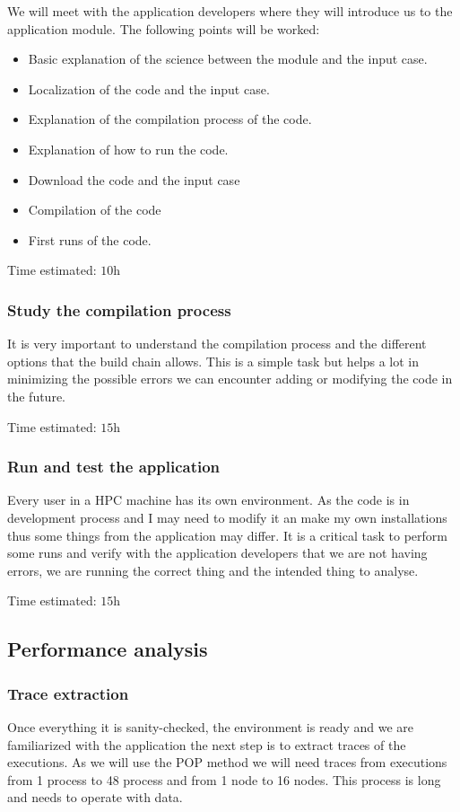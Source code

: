 We will meet with the application developers where they will introduce us to the application module. The following points will be worked:
\begin{itemize}
  \item Basic explanation of the science between the module and the input case.
  \item Localization of the code and the input case.
  \item Explanation of the compilation process of the code.
  \item Explanation of how to run the code.
  \item Download the code and the input case
  \item Compilation of the code
  \item First runs of the code.
\end{itemize}

Time estimated: $\si{10\hour}$
\subsubsection{Study the compilation process}

It is very important to understand the compilation process and the different options that the build chain allows. This is a simple task but helps a lot in minimizing the possible errors we can encounter adding or modifying the code in the future.

Time estimated: $\si{15\hour}$

\subsubsection{Run and test the application}
Every user in a HPC machine has its own environment. As the code is in development process and I may need to modify it an make my own installations thus some things from the application may differ. It is a critical task to perform some runs and verify with the application developers that we are not having errors, we are running the correct thing and the intended thing to analyse.  

Time estimated: $\si{15\hour}$

\subsection{Performance analysis}

\subsubsection{Trace extraction}
Once everything it is sanity-checked, the environment is ready and we are familiarized with the application the next step is to extract traces of the executions. As we will use the POP method we will need traces from executions from 1 process to 48 process and from 1 node to 16 nodes. This process is long and needs to operate with data.

